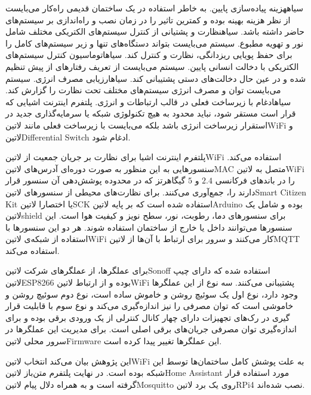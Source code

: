  ‌سیاه{هزینه پیاده‌سازی پایین}. به خاطر استفاده در یک ساختمان قدیمی راه‌کار می‌بایست از نظر هزینه بهینه بوده و کمترین تاثیر را در زمان نصب و راه‌اندازی
بر سیستم‌های حاضر داشته باشد.
 ‌سیاه{نظارت و پشتیانی از کنترل سیستم‌های الکتریکی مختلف شامل نور و تهویه مطبوع}. سیستم می‌بایست بتواند دستگاه‌های تنها
و زیر سیستم‌های کامل را برای حفظ پویایی ریزدانگی، نظارت و کنترل کند.
 ‌سیاه{اتوماسیون کنترل سیستم‌های الکتریکی با دخالت انسانی پایین}. سیستم می‌بایست از تعریف رفتارهای از پیش تنظیم شده و در عین حال دخالت‌های دستی
پشتیبانی کند.
 ‌سیاه{ارزیابی مصرف انرژی}. سیستم می‌بایست توان و مصرف انرژی سیستم‌های مختلف تحت نظارت را گزارش کند.
 ‌سیاه{ادغام با زیرساخت فعلی در قالب ارتباطات و انرژی}. پلتفرم اینترنت اشیایی که قرار است مستقر شود، نباید محدود به هیچ تکنولوژی شبکه یا سرمایه‌گذاری
جدید در استقرار زیرساخت انرژی باشد بلکه می‌بایست با زیرساخت فعلی مانند ‌لاتین{WiFi} و ‌لاتین{Differential Switch} ادغام شود.

پلتفرم اینترنت اشیا برای نظارت بر جریان جمعیت از ‌لاتین{WiFi} استفاده می‌کند. سنسورهایی به این منظور به صورت دوره‌ای آدرس‌های ‌لاتین{MAC} متصل به
‌لاتین{WiFi} را در باندهای فرکانسی $2.4$ و $5$ گیگاهرتز که در محدوده پوشش‌دهی آن سنسور قرار دارند را، جمع‌آوری می‌کنند.
برای نظارت‌های محیطی از سنسورهای ‌لاتین{Smart Citizen Kit} یا اختصارا ‌لاتین{SCK} استفاده شده است که بر پایه ‌لاتین{Arduino} بوده
و شامل یک ‌لاتین{shield} برای سنسورهای دما، رطوبت، نور، سطح نویز و کیفیت هوا است. این سنسورها می‌توانند داخل یا خارج از ساختمان استفاده شوند.
هر دو این سنسورها با استفاده از شبکه‌ی ‌لاتین{WiFi} کار می‌کنند و سرور برای ارتباط با آن‌ها از ‌لاتین{MQTT} استفاده می‌کند.

برای عملگرها، از عملگرهای شرکت ‌لاتین{Sonoff} استفاده شده که دارای چیپ ‌لاتین{ESP8266} بوده و از ارتباط ‌لاتین{WiFi} پشتیبانی می‌کنند.
سه نوع از این عملگرها وجود دارد، نوع اول یک سوئیچ روشن و خاموش ساده است، نوع دوم سوئیچ روشن و خاموشی است که توان مصرفی را نیز اندازه‌گیری می‌کند و
نوع سوم با قابلیت قرار گیری در رک‌های تجهیزات دارای چهار کانال کنترلی از یک ورودی برقی بوده و برای اندازه‌گیری توان مصرفی جریان‌های برقی اصلی است.
برای مدیریت این عملگرها در سرور محلی ‌لاتین{Firmware} این عملگرها تغییر پیدا کرده است.

این پژوهش بیان می‌کند انتخاب ‌لاتین{WiFi} به علت پوشش کامل ساختمان‌ها توسط این شبکه بوده است.
در نهایت پلتفرم متن‌باز ‌لاتین{Home Assistant} مورد استفاده قرار گرفته است و به همراه دلال پیام ‌لاتین{Mosquitto} روی یک برد ‌لاتین{RPi4}
نصب شده‌اند.

